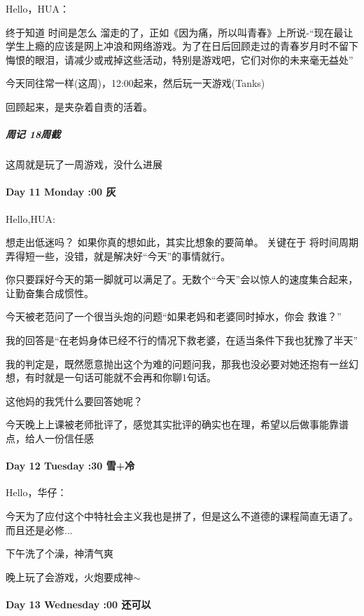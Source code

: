 \documentclass[UTF8,a4paper,8pt]{ctexbook}
\begin{document}
		 Hello，HUA：
		 
		 终于知道 时间是怎么 溜走的了，正如《因为痛，所以叫青春》上所说-“现在最让学生上瘾的应该是网上冲浪和网络游戏。为了在日后回顾走过的青春岁月时不留下悔恨的眼泪，请减少或戒掉这些活动，特别是游戏吧，它们对你的未来毫无益处”
		 
		 今天同往常一样(这周)，12:00起来，然后玩一天游戏(Tanks)
		 
		 回顾起来，是夹杂着自责的活着。
		 
		 \subparagraph{周记 \quad 18周截}
		 这周就是玩了一周游戏，没什么进展
     \paragraph{Day 11  Monday   :00  \quad 灰}
     
	     Hello,HUA:
	     
	     想走出低迷吗？ 如果你真的想如此，其实比想象的要简单。  关键在于 将时间周期弄得短一些，没错，就是解决好“今天”的事情就行。
	     
	     你只要踩好今天的第一脚就可以满足了。无数个“今天”会以惊人的速度集合起来，让勤奋集合成惯性。
	     
	     今天被老范问了一个很当头炮的问题“如果老妈和老婆同时掉水，你会 救谁？”
	     
	     我的回答是“在老妈身体已经不行的情况下救老婆，在适当条件下我也犹豫了半天”
	     
	     我的判定是，既然愿意抛出这个为难的问题问我，那我也没必要对她还抱有一丝幻想，有时就是一句话可能就不会再和你聊1句话。
	     
	     这他妈的我凭什么要回答她呢？
	     
	     今天晚上上课被老师批评了，感觉其实批评的确实也在理，希望以后做事能靠谱点，给人一份信任感
	     
	     
     \paragraph{Day 12  Tuesday :30 \quad  雪+冷     }
	     Hello，华仔：
	     
	     今天为了应付这个中特社会主义我也是拼了，但是这么不道德的课程简直无语了。而且还是必修...
	     
	     下午洗了个澡，神清气爽
	     
	     晚上玩了会游戏，火炮要成神$\sim$
     \paragraph{Day 13  Wednesday    :00 \quad 还可以  }
     
\end{document}
